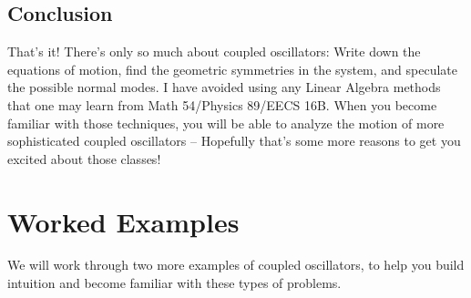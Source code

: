 \documentclass[11pt]{article}
\theoremstyle{gangnamstyle}{\newtheorem{definition}{Definition}[]}
\theoremstyle{gangnamstyle}{\newtheorem{example}{Example}[]}
\theoremstyle{gangnamstyle}{\newtheorem{problem}{Problem}[]}
\theoremstyle{gangnamstyle}{\newtheorem{warning}{Warning}[]}
\begin{document}
\subsection{Conclusion}
That's it! There's only so much about coupled oscillators: Write down the equations of motion, find the geometric symmetries in the system, and speculate the possible normal modes. I have avoided using any Linear Algebra methods that one may learn from Math 54/Physics 89/EECS 16B. When you become familiar with those techniques, you will be able to analyze the motion of more sophisticated coupled oscillators -- Hopefully that's some more reasons to get you excited about those classes! 

\pagebreak

\section{Worked Examples}

We will work through two more examples of coupled oscillators, to help you build intuition and become familiar with these types of problems. 
\end{document}
